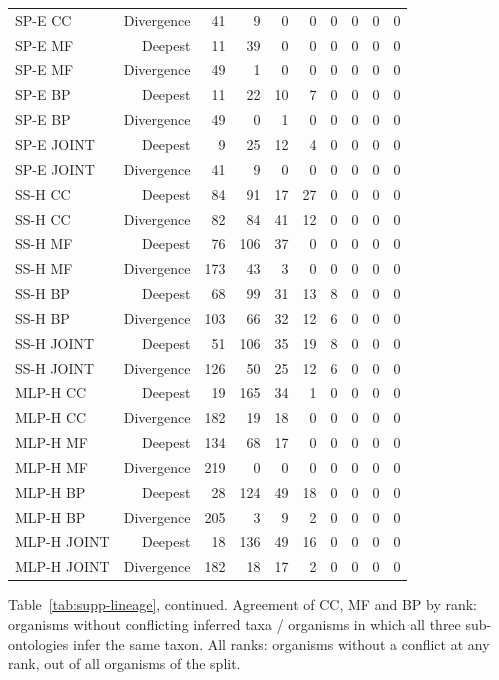\begin{longtable}{lrrrrrrrrr}
SP-E CC & Divergence & 41 & 9 & 0 & 0 & 0 & 0 & 0 & 0 \\
SP-E MF & Deepest & 11 & 39 & 0 & 0 & 0 & 0 & 0 & 0 \\
SP-E MF & Divergence & 49 & 1 & 0 & 0 & 0 & 0 & 0 & 0 \\
SP-E BP & Deepest & 11 & 22 & 10 & 7 & 0 & 0 & 0 & 0 \\
SP-E BP & Divergence & 49 & 0 & 1 & 0 & 0 & 0 & 0 & 0 \\
SP-E JOINT & Deepest & 9 & 25 & 12 & 4 & 0 & 0 & 0 & 0 \\
SP-E JOINT & Divergence & 41 & 9 & 0 & 0 & 0 & 0 & 0 & 0 \\
SS-H CC & Deepest & 84 & 91 & 17 & 27 & 0 & 0 & 0 & 0 \\
SS-H CC & Divergence & 82 & 84 & 41 & 12 & 0 & 0 & 0 & 0 \\
SS-H MF & Deepest & 76 & 106 & 37 & 0 & 0 & 0 & 0 & 0 \\
SS-H MF & Divergence & 173 & 43 & 3 & 0 & 0 & 0 & 0 & 0 \\
SS-H BP & Deepest & 68 & 99 & 31 & 13 & 8 & 0 & 0 & 0 \\
SS-H BP & Divergence & 103 & 66 & 32 & 12 & 6 & 0 & 0 & 0 \\
SS-H JOINT & Deepest & 51 & 106 & 35 & 19 & 8 & 0 & 0 & 0 \\
SS-H JOINT & Divergence & 126 & 50 & 25 & 12 & 6 & 0 & 0 & 0 \\
MLP-H CC & Deepest & 19 & 165 & 34 & 1 & 0 & 0 & 0 & 0 \\
MLP-H CC & Divergence & 182 & 19 & 18 & 0 & 0 & 0 & 0 & 0 \\
MLP-H MF & Deepest & 134 & 68 & 17 & 0 & 0 & 0 & 0 & 0 \\
MLP-H MF & Divergence & 219 & 0 & 0 & 0 & 0 & 0 & 0 & 0 \\
MLP-H BP & Deepest & 28 & 124 & 49 & 18 & 0 & 0 & 0 & 0 \\
MLP-H BP & Divergence & 205 & 3 & 9 & 2 & 0 & 0 & 0 & 0 \\
MLP-H JOINT & Deepest & 18 & 136 & 49 & 16 & 0 & 0 & 0 & 0 \\
MLP-H JOINT & Divergence & 182 & 18 & 17 & 2 & 0 & 0 & 0 & 0 \\
\bottomrule
\end{longtable}
\endgroup
\par Table~\ref{tab:supp-lineage}, continued. Agreement of CC, MF and BP by rank: organisms without conflicting inferred taxa / organisms in which all three sub-ontologies infer the same taxon. All ranks: organisms without a conflict at any rank, out of all organisms of the split.
